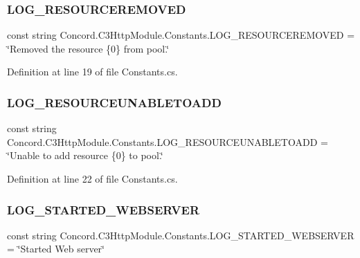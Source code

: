 \subsubsection{\texorpdfstring{LOG\_RESOURCEREMOVED}{LOG\_RESOURCEREMOVED}}
{\footnotesize\ttfamily const string Concord.\+C3\+Http\+Module.\+Constants.\+L\+O\+G\+\_\+\+R\+E\+S\+O\+U\+R\+C\+E\+R\+E\+M\+O\+V\+ED = \char`\"{}Removed the resource \{0\} from pool.\char`\"{}}



Definition at line 19 of file Constants.\+cs.

\mbox{\label{class_concord_1_1_c3_http_module_1_1_constants_a02c3a593b6498124afc3721f3f5c4299}} 
\subsubsection{\texorpdfstring{LOG\_RESOURCEUNABLETOADD}{LOG\_RESOURCEUNABLETOADD}}
{\footnotesize\ttfamily const string Concord.\+C3\+Http\+Module.\+Constants.\+L\+O\+G\+\_\+\+R\+E\+S\+O\+U\+R\+C\+E\+U\+N\+A\+B\+L\+E\+T\+O\+A\+DD = \char`\"{}Unable to add resource \{0\} to pool.\char`\"{}}



Definition at line 22 of file Constants.\+cs.

\mbox{\label{class_concord_1_1_c3_http_module_1_1_constants_aa9a8451889ca458610a474d8824cbba5}} 
\subsubsection{\texorpdfstring{LOG\_STARTED\_WEBSERVER}{LOG\_STARTED\_WEBSERVER}}
{\footnotesize\ttfamily const string Concord.\+C3\+Http\+Module.\+Constants.\+L\+O\+G\+\_\+\+S\+T\+A\+R\+T\+E\+D\+\_\+\+W\+E\+B\+S\+E\+R\+V\+ER = \char`\"{}Started Web server\char`\"{}}



